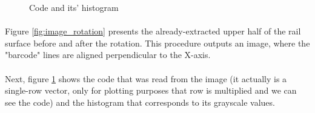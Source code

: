 \begin{figure}[H]
     \centering
     \vfill
     \caption{Code and its' histogram}
     \label{fig:code_with_histogram}
\end{figure}

\paragraph{}
Figure \ref{fig:image_rotation} presents the already-extracted upper half of the rail surface before and after the rotation. This procedure outputs an image, where the "barcode" lines are aligned perpendicular to the X-axis. 

\paragraph{}
Next, figure \ref{fig:code_with_histogram} shows the code that was read from the image (it actually is a single-row vector, only for plotting purposes that row is multiplied and we can see the code) and the histogram that corresponds to its grayscale values.

